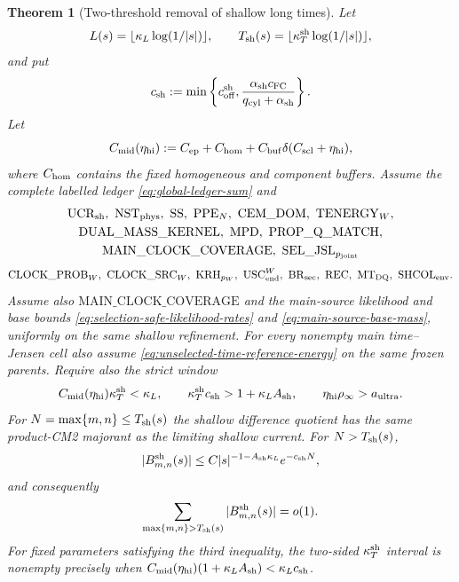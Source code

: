 \documentclass[11pt]{article}
\newtheorem{theorem}{Theorem}[section]
\begin{document}
\begin{theorem}[Two-threshold removal of shallow long times]
\label{thm:shallow-two-threshold}
Let
\[
 L(s)=\lfloor\kappa_L\log(1/|s|)\rfloor,
 \qquad T_{\rm sh}(s)=\lfloor\kappa_T^{\rm sh}\log(1/|s|)\rfloor,
\]
and put
\begin{equation}
\label{eq:shallow-collar-rate}
 c_{\rm sh}:=\min\left\{c_{\rm off}^{\rm sh},
 \frac{\alpha_{\rm sh}c_{\rm FC}}
 {q_{\rm cyl}+\alpha_{\rm sh}}\right\}.
\end{equation}
Let
\begin{equation}
\label{eq:intermediate-resolving-constant}
 C_{\rm mid}(\eta_{\rm hi})
 :=C_{\rm ep}+C_{\rm hom}
   +C_{\rm buf}\delta(C_{\rm scl}+\eta_{\rm hi}),
\end{equation}
where $C_{\rm hom}$ contains the fixed homogeneous and component buffers.
Assume the complete labelled ledger \eqref{eq:global-ledger-sum} and
\[
 \begin{gathered}
 \mathrm{UCR}_{\rm sh},\ \mathrm{NST}_{\rm phys},\ \mathrm{SS},\
 \mathrm{PPE}_{N},\ \mathrm{CEM\_DOM},\ \mathrm{TENERGY}_{W},\\
 \mathrm{DUAL\_MASS\_KERNEL},\ \mathrm{MPD},\
 \mathrm{PROP\_Q\_MATCH},\\
 \mathrm{MAIN\_CLOCK\_COVERAGE},\
 \mathrm{SEL\_JSL}_{p_{\rm joint}}
 \end{gathered}
\]
\[
 \mathrm{CLOCK\_PROB}_{W},\ \mathrm{CLOCK\_SRC}_{W},\
 \mathrm{KRH}_{p_W},\ \mathrm{USC}_{\rm end}^{W},\
 \mathrm{BR}_{\rm sec},\ \mathrm{REC},\ \mathrm{MT}_{\rm DQ},\
 \mathrm{SHCOL}_{\rm env}.
\]
Assume also $\mathrm{MAIN\_CLOCK\_COVERAGE}$ and the main-source likelihood
and base bounds \eqref{eq:selection-safe-likelihood-rates} and
\eqref{eq:main-source-base-mass}, uniformly on the same shallow refinement.
For every nonempty main time--Jensen cell also assume
\eqref{eq:unselected-time-reference-energy} on the same frozen parents.
Require also the strict window
\begin{equation}
\label{eq:shallow-time-window}
 C_{\rm mid}(\eta_{\rm hi})\kappa_T^{\rm sh}<\kappa_L,
 \qquad
 \kappa_T^{\rm sh}c_{\rm sh}>1+\kappa_LA_{\rm sh},
 \qquad \eta_{\rm hi}\rho_\infty>a_{\rm ultra}.
\end{equation}
For $N=\max\{m,n\}\le T_{\rm sh}(s)$ the shallow difference quotient has
the same product-CM2 majorant as the limiting shallow current.  For
$N>T_{\rm sh}(s)$,
\begin{equation}
\label{eq:shallow-long-time-bound}
 |B^{\rm sh}_{m,n}(s)|
 \le C|s|^{-1-A_{\rm sh}\kappa_L}e^{-c_{\rm sh}N},
\end{equation}
and consequently
\begin{equation}
\label{eq:shallow-long-time-sum}
 \sum_{\max\{m,n\}>T_{\rm sh}(s)}
 |B^{\rm sh}_{m,n}(s)|=o(1).
\end{equation}
For fixed parameters satisfying the third inequality, the two-sided
$\kappa_T^{\rm sh}$ interval is nonempty precisely when
$C_{\rm mid}(\eta_{\rm hi})(1+\kappa_LA_{\rm sh})
 <\kappa_Lc_{\rm sh}$.
\end{theorem}
\end{document}
